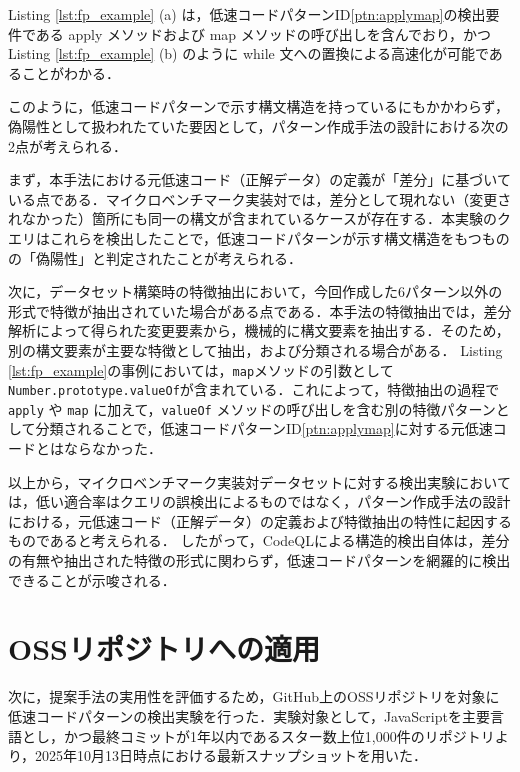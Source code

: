 \documentclass[11pt]{jreport}
\begin{document}
Listing \ref{lst:fp_example} (a) は，低速コードパターンID\ref{ptn:applymap}の検出要件である apply メソッドおよび map メソッドの呼び出しを含んでおり，かつ Listing \ref{lst:fp_example} (b) のように while 文への置換による高速化が可能であることがわかる．

このように，低速コードパターンで示す構文構造を持っているにもかかわらず，偽陽性として扱われたていた要因として，パターン作成手法の設計における次の2点が考えられる．

まず，本手法における元低速コード（正解データ）の定義が「差分」に基づいている点である．マイクロベンチマーク実装対では，差分として現れない（変更されなかった）箇所にも同一の構文が含まれているケースが存在する．本実験のクエリはこれらを検出したことで，低速コードパターンが示す構文構造をもつものの「偽陽性」と判定されたことが考えられる．

次に，データセット構築時の特徴抽出において，今回作成した6パターン以外の形式で特徴が抽出されていた場合がある点である．本手法の特徴抽出では，差分解析によって得られた変更要素から，機械的に構文要素を抽出する．そのため，別の構文要素が主要な特徴として抽出，および分類される場合がある．
Listing \ref{lst:fp_example}の事例においては，\texttt{map}メソッドの引数として \texttt{Number.prototype.valueOf}が含まれている．これによって，特徴抽出の過程で \texttt{apply} や \texttt{map} に加えて，\texttt{valueOf} メソッドの呼び出しを含む別の特徴パターンとして分類されることで，低速コードパターンID\ref{ptn:applymap}に対する元低速コードとはならなかった．

以上から，マイクロベンチマーク実装対データセットに対する検出実験においては，低い適合率はクエリの誤検出によるものではなく，パターン作成手法の設計における，元低速コード（正解データ）の定義および特徴抽出の特性に起因するものであると考えられる．
したがって，CodeQLによる構造的検出自体は，差分の有無や抽出された特徴の形式に関わらず，低速コードパターンを網羅的に検出できることが示唆される．



\section{OSSリポジトリへの適用}
\label{sec:toOSS}

次に，提案手法の実用性を評価するため，GitHub上のOSSリポジトリを対象に低速コードパターンの検出実験を行った．実験対象として，JavaScriptを主要言語とし，かつ最終コミットが1年以内であるスター数上位1,000件のリポジトリより，2025年10月13日時点における最新スナップショットを用いた．
\end{document}

